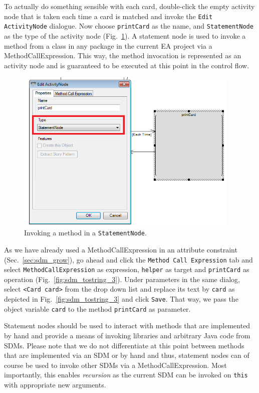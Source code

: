 To actually do something sensible with each card, double-click the empty
activity node that is taken each time a card is matched and invoke the \texttt{Edit
ActivityNode} dialogue.  Now choose \texttt{printCard} as
the name, and \texttt{StatementNode} as the type of the activity node
(Fig.~\ref{fig:sdm_tostring_2}).
A statement node is used to invoke a method from a class in any package in the
current EA project via a MethodCallExpression.  This way, the method invocation
is represented as an activity node and is guaranteed to be executed at this
point in the control flow. 

\begin{figure}[htbp]
\begin{center}
  \includegraphics[width=0.95\textwidth]{pics/sdmBilder/toString/sdm73}
  \caption{Invoking a method in a \texttt{StatementNode}.}  
  \label{fig:sdm_tostring_2}
\end{center}
\end{figure}

As we have already used a MethodCallExpression in an attribute constraint
(Sec.~\ref{sec:sdm_grow}), go ahead and click the \texttt{Method Call
Expression} tab and select \texttt{MethodCallExpression} as expression,
\texttt{helper} as target and \texttt{printCard} as operation
(Fig.~\ref{fig:sdm_tostring_3}). Under parameters in the same dialog, select
\texttt{<Card card>} from the drop down list and replace its text by
\texttt{card} as depicted in Fig.~\ref{fig:sdm_tostring_3} and click
\texttt{Save}. That way, we pass the object variable \texttt{card} to the method
\texttt{printCard} as parameter.

Statement nodes should be used to interact with methods that are
implemented by hand and provide a means of invoking libraries and arbitrary Java
code from SDMs.  Please note that we do not differentiate at this point between
methods that are implemented via an SDM or by hand and thus, statement nodes can
of course be used to invoke other SDMs via a MethodCallExpression.  Most
importantly, this enables \emph{recursion} as the current SDM can be invoked on
\texttt{this} with appropriate new arguments.  

